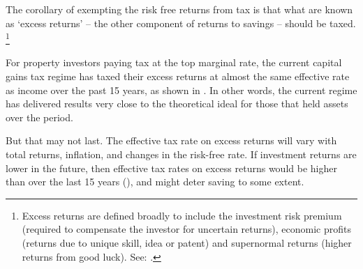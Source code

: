 The corollary of exempting the risk free returns from tax is that what are known as ‘excess returns’ – the other component of returns to savings – should be taxed.%
\footnote{Excess returns are defined broadly to include the investment risk premium (required to compensate the investor for uncertain returns), economic profits (returns due to unique skill, idea or patent) and supernormal returns (higher returns from good luck). See: \textcite[][153]{PresidentsAdvisoryPanelTaxReform2005Proposals}.}

For property investors paying tax at the top marginal rate, the current capital gains tax regime has taxed their excess returns at almost the same effective rate as income over the past 15 years, as shown in . In other words, the current regime has delivered results very close to the theoretical ideal for those that held assets over the period. 

But that may not last. The effective tax rate on excess returns will vary with total returns, inflation, and changes in the risk-free rate. If investment returns are lower in the future, then effective tax rates on excess returns would be higher than over the last 15 years (), and might deter saving to some extent. 

